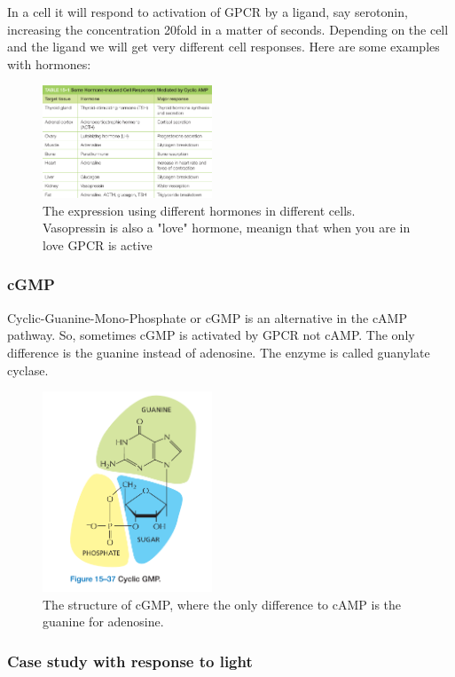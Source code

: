 \documentclass[../main.tex]{subfiles}
\begin{document}
In a cell it will respond to activation of GPCR by a ligand, say serotonin, increasing the concentration 20fold in a matter of seconds. Depending on the cell and the ligand we will get very different cell responses. Here are some examples with hormones:
\begin{figure}[H]
	\centering
	\includegraphics[width=0.45\textwidth]{cAMP_horm}
	\caption{The expression using different hormones in different cells. Vasopressin is also a "love" hormone, meanign that when you are in love GPCR is active}
\end{figure}

\subsubsection{cGMP}

Cyclic-Guanine-Mono-Phosphate or cGMP is an alternative in the cAMP pathway. So, sometimes cGMP is activated by GPCR not cAMP. The only difference is the guanine instead of adenosine. The enzyme is called guanylate cyclase. 
\begin{figure}[H]
	\centering
	\includegraphics[width=0.45\textwidth]{cGmp}
	\caption{The structure of cGMP, where the only difference to cAMP is the guanine for adenosine.}
\end{figure}

\subsubsection{Case study with response to light}
\end{document}
